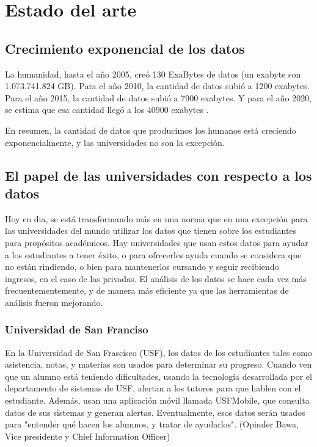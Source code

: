 \chapter{Estado del arte}
\label{sec:hello}

\section[Crecimiento exponencial de los datos]{Crecimiento exponencial de los datos} 


La humanidad, hasta el año 2005, creó 130 ExaBytes de datos (un exabyte son 1.073.741.824 GB). Para el año 2010, la cantidad de datos subió a 1200 exabytes. Para el año 2015, la cantidad de datos subió a 7900 exabytes. Y para el año 2020, se estima que esa cantidad llegó a los 40900 exabytes \cite{IDC}.

En resumen, la cantidad de datos que producimos los humanos está creciendo exponencialmente, y las universidades no son la excepción.



\section[El papel de las universidades con respecto a los datos]{El papel de las universidades con respecto a los datos}

Hoy en dia, se está transformando más en una norma que en una excepción para las universidades del mundo utilizar los datos que tienen sobre los estudiantes para propósitos académicos. Hay universidades que usan estos datos para ayudar a los estudiantes a tener éxito, o para ofrecerles ayuda cuando se considera que no están rindiendo, o bien para mantenerlos cursando y seguir recibiendo ingresos, en el caso de las privadas.
El análisis de los datos se hace cada vez más frecuentementemente, y de manera más eficiente ya que las herramientas de análisis fueron mejorando.

\subsection[Universidad de San Franciso]{Universidad de San Franciso}

En la Universidad de San Frascisco (USF), los datos de los estudiantes tales como asistencia, notas, y materias son usados para determinar su progreso. Cuando ven que un alumno está teniendo dificultades, usando la tecnología desarrollada por el departamento de sistemas de USF, alertan a los tutores para que hablen con el estudiante.
Además, usan una aplicación móvil llamada USFMobile, que consulta datos de sus sistemas y generan alertas.
Eventualmente, esos datos serán usados para "entender qué hacen los alumnos, y tratar de ayudarlos". (Opinder Bawa, Vice presidente y Chief Information Officer)


